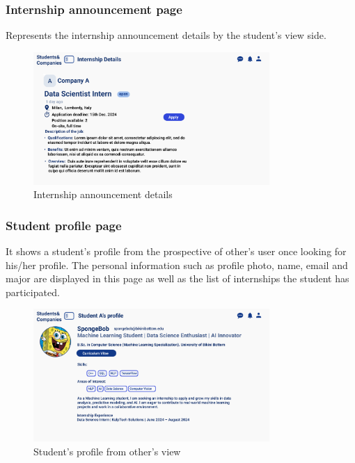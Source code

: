 \subsubsection{Internship announcement page}
Represents the internship announcement details by the student's view side.
\begin{figure}[H]
    \centering
    \includegraphics[width=0.8\textwidth]{Images/UI/Internship details-student view.png}
    \caption{Internship announcement details }\label{fig:Internship announcement details}
\end{figure}
\subsubsection{Student profile page}
It shows a student's profile from the prospective of other's user once looking for his/her profile.
The personal information such as profile photo, name, email and major are displayed in this page as 
well as the list of internships the student has participated. 
\begin{figure}[H]
    \centering
    \includegraphics[width=0.8\textwidth]{Images/UI/Student profile.png}
    \caption{Student's profile from other's view}\label{fig:Student's profile from other's view}
\end{figure}

\newpage
